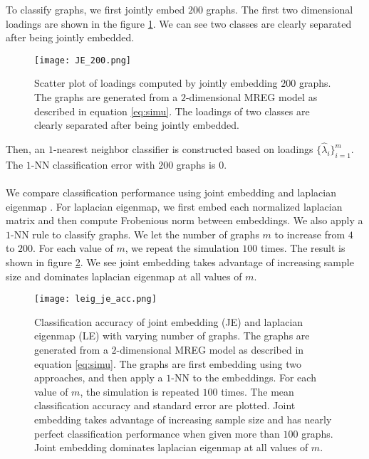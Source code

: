 \documentclass[10pt,journal,compsoc]{IEEEtran}
\begin{document}
\noindent To classify graphs, we first jointly embed $200$ graphs. The first two dimensional loadings are shown in the figure \ref{fig:load}. We can see two classes are clearly separated after being jointly embedded.
\begin{figure}[!htbp]
	\centering
	\texttt{[image: JE\_200.png]}
	\caption{Scatter plot of loadings computed by jointly embedding $200$ graphs. The graphs are generated from a $2$-dimensional MREG model as described in equation \ref{eq:simu}. The loadings of two classes are clearly separated after being jointly embedded. }
	\label{fig:load}
\end{figure}
Then, an $1$-nearest neighbor classifier is constructed based on loadings $\{\hat{\lambda}_i\}_{i=1}^m$. The $1$-NN classification error with $200$ graphs is $0$. \\
\\
\noindent We compare classification performance using joint embedding and laplacian eigenmap \cite{belkin2003laplacian}. For laplacian eigenmap, we first embed each normalized laplacian matrix and then compute Frobenious norm between embeddings. We also apply a $1$-NN rule to classify graphs. We let the number of graphs $m$ to increase from $4$ to $200$. For each value of $m$, we repeat the simulation $100$ times. The result is shown in figure \ref{fig:acc}. We see joint embedding takes advantage of increasing sample size and dominates laplacian eigenmap at all values of $m$. 
\begin{figure}[!htbp]
	\centering
	\texttt{[image: leig\_je\_acc.png]}
	\caption{Classification accuracy of joint embedding (JE) and laplacian eigenmap (LE) with varying number of graphs. The graphs are generated from a $2$-dimensional MREG model as described in equation \ref{eq:simu}. The graphs are first embedding using two approaches, and then apply a $1$-NN to the embeddings. For each value of $m$, the simulation is repeated $100$ times. The mean classification accuracy and standard error are plotted. Joint embedding takes advantage of increasing sample size and has nearly perfect classification performance when given more than $100$ graphs. Joint embedding dominates laplacian eigenmap at all values of $m$.}
	\label{fig:acc}
\end{figure} 
\end{document}
